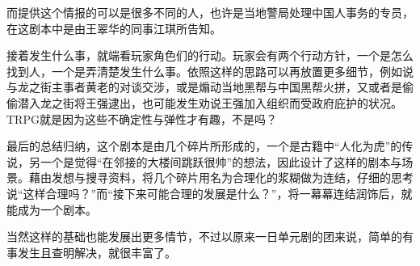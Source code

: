 \documentclass[a4paper,zihao=-4,notitlepage,twoside,openright]{ctexart}
\begin{document}
而提供这个情报的可以是很多不同的人，也许是当地警局处理中国人事务的专员，在这剧本中是由王翠华的同事江琪所告知。

接着发生什么事，就端看玩家角色们的行动。玩家会有两个行动方针，一个是怎么找到人，一个是弄清楚发生什么事。依照这样的思路可以再放置更多细节，例如说与龙之街主事者黄老的对谈交涉，或是煽动当地黑帮与中国黑帮火拼，又或者是偷偷潜入龙之街将王强逮出，也可能发生劝说王强加入组织而受政府庇护的状况。TRPG就是因为这些不确定性与弹性才有趣，不是吗？

最后的总结归纳，这个剧本是由几个碎片所形成的，一个是古籍中“人化为虎”的传说，另一个是觉得“在邻接的大楼间跳跃很帅”的想法，因此设计了这样的剧本与场景。藉由发想与搜寻资料，将几个碎片用名为合理化的浆糊做为连结，仔细的思考说“这样合理吗？”而“接下来可能合理的发展是什么？”，将一幕幕连结润饰后，就能成为一个剧本。

当然这样的基础也能发展出更多情节，不过以原来一日单元剧的团来说，简单的有事发生且查明解决，就很丰富了。
\end{document}
